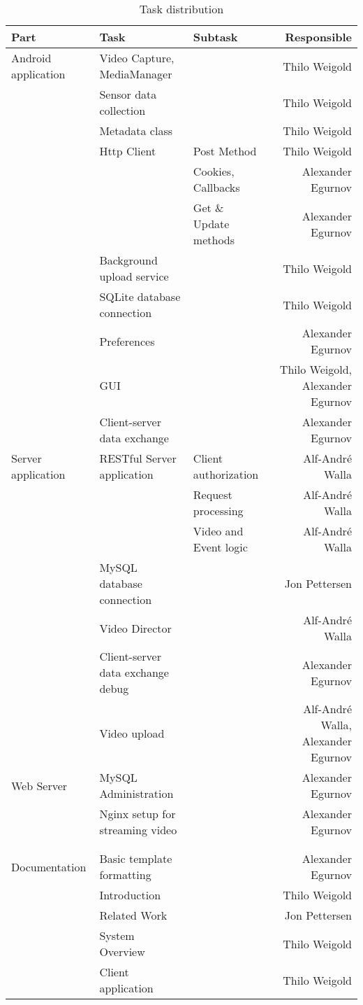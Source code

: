 \documentclass[conference]{IEEEtran}
\begin{document}
\begin{table*}[t]
	\centering
	\renewcommand{\arraystretch}{1.5}
	\caption{Task distribution}
	\label{tab:task_distr}
	\begin{tabular}{lllr}
		\toprule
		Part & Task  & Subtask & Responsible \\
		\midrule
		Android application 
			& Video Capture, MediaManager &     & Thilo Weigold \\
			& Sensor data collection &       & Thilo Weigold \\
			& Metadata class &       & Thilo Weigold \\
			& Http Client & Post Method & Thilo Weigold \\
			&       & Cookies, Callbacks & Alexander Egurnov \\
			&       & Get \& Update methods & Alexander Egurnov \\
			& Background upload service  &       & Thilo Weigold \\
			& SQLite database connection &       & Thilo Weigold \\
			& Preferences &       & Alexander Egurnov \\
			& GUI   &       & Thilo Weigold, Alexander Egurnov \\
			& Client-server data exchange &       & Alexander Egurnov \\
		\midrule
			Server application 
			& RESTful Server application & Client authorization & Alf-André Walla \\
			&       & Request processing & Alf-André Walla \\
			&       & Video and Event logic & Alf-André Walla \\
			& MySQL database connection &       & Jon Pettersen \\
			& Video Director  &       & Alf-André Walla \\
			& Client-server data exchange debug &       & Alexander Egurnov \\
			& Video upload &       & Alf-André Walla, Alexander Egurnov \\
		\midrule
			Web Server 
			& MySQL Administration &       & Alexander Egurnov \\
			& Nginx setup for streaming video &       & Alexander Egurnov \\
			&       &       &  \\
			&       &       &  \\
		\midrule
			Documentation & Basic template formatting & & Alexander Egurnov \\
			&       Introduction      & & Thilo Weigold \\
			&       Related Work      & & Jon Pettersen  \\
			&       System Overview   & & Thilo Weigold  \\
			&		Client application & & Thilo Weigold \\
		\bottomrule
    \end{tabular}%
\end{table*}%
\hfill
\end{document}

